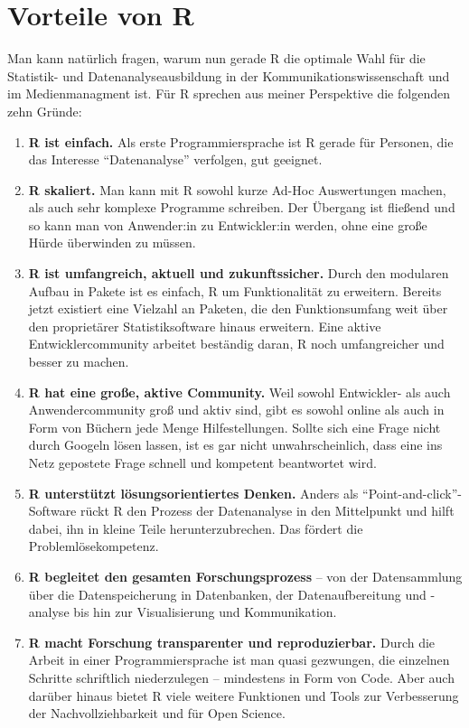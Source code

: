 \documentclass[
]{book}
\begin{document}
\hypertarget{vorteile-von-r}{%
\section{Vorteile von R}\label{vorteile-von-r}}

Man kann natürlich fragen, warum nun gerade R die optimale Wahl für die Statistik- und Datenanalyseausbildung in der Kommunikationswissenschaft und im Medienmanagment ist. Für R sprechen aus meiner Perspektive die folgenden zehn Gründe:

\begin{enumerate}
\def\labelenumi{\arabic{enumi}.}
\item
  \textbf{R ist einfach.} Als erste Programmiersprache ist R gerade für Personen, die das Interesse ``Datenanalyse'' verfolgen, gut geeignet.
\item
  \textbf{R skaliert.} Man kann mit R sowohl kurze Ad-Hoc Auswertungen machen, als auch sehr komplexe Programme schreiben. Der Übergang ist fließend und so kann man von Anwender:in zu Entwickler:in werden, ohne eine große Hürde überwinden zu müssen.
\item
  \textbf{R ist umfangreich, aktuell und zukunftssicher.} Durch den modularen Aufbau in Pakete ist es einfach, R um Funktionalität zu erweitern. Bereits jetzt existiert eine Vielzahl an Paketen, die den Funktionsumfang weit über den proprietärer Statistiksoftware hinaus erweitern. Eine aktive Entwicklercommunity arbeitet beständig daran, R noch umfangreicher und besser zu machen.
\item
  \textbf{R hat eine große, aktive Community.} Weil sowohl Entwickler- als auch Anwendercommunity groß und aktiv sind, gibt es sowohl online als auch in Form von Büchern jede Menge Hilfestellungen. Sollte sich eine Frage nicht durch Googeln lösen lassen, ist es gar nicht unwahrscheinlich, dass eine ins Netz gepostete Frage schnell und kompetent beantwortet wird.
\item
  \textbf{R unterstützt lösungsorientiertes Denken.} Anders als ``Point-and-click''-Software rückt R den Prozess der Datenanalyse in den Mittelpunkt und hilft dabei, ihn in kleine Teile herunterzubrechen. Das fördert die Problemlösekompetenz.
\item
  \textbf{R begleitet den gesamten Forschungsprozess} -- von der Datensammlung über die Datenspeicherung in Datenbanken, der Datenaufbereitung und -analyse bis hin zur Visualisierung und Kommunikation.
\item
  \textbf{R macht Forschung transparenter und reproduzierbar.} Durch die Arbeit in einer Programmiersprache ist man quasi gezwungen, die einzelnen Schritte schriftlich niederzulegen -- mindestens in Form von Code. Aber auch darüber hinaus bietet R viele weitere Funktionen und Tools zur Verbesserung der Nachvollziehbarkeit und für Open Science.

\end{enumerate}
\end{document}
